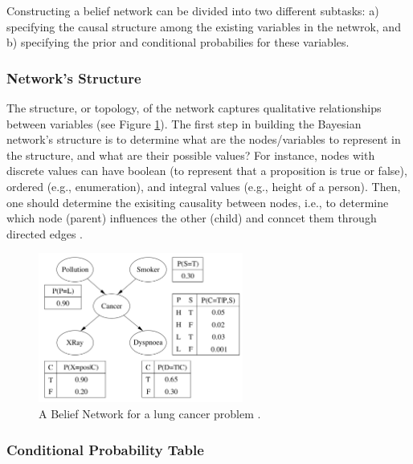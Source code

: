 \documentclass[11pt]{article}
\begin{document}
Constructing a belief network can be divided into two different subtasks: a)
specifying the causal structure among the existing variables in the netwrok, and
b) specifying the prior and conditional probabilies for these variables.

\subsubsection{Network's Structure}

The structure, or topology, of the network captures qualitative relationships
between variables (see Figure \ref{fig:bbn}). The first step in building the
Bayesian network's structure is to determine what are the nodes/variables to
represent in the structure, and what are their possible values? For instance,
nodes with discrete values can have boolean (to represent that a proposition is
true or false), ordered (e.g., enumeration), and integral values (e.g., height
of a person). Then, one should determine the exisiting causality between nodes,
i.e., to determine which node (parent) influences the other (child) and conncet
them through directed edges \cite{korb:bayesian-ai}.

\begin{figure}[tbh]
  \center
  \includegraphics[width=0.6\textwidth]{figure/bbn.png}
  \caption{A Belief Network for a lung cancer problem
  \cite{korb:bayesian-ai}.}
  \label{fig:bbn}
\end{figure}

\subsubsection{Conditional Probability Table}
\end{document}
